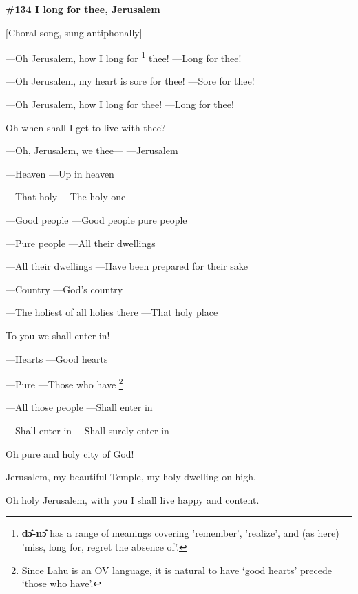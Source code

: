 
\textbf{\#134  I long for thee, Jerusalem}

[Choral song, sung antiphonally]

---Oh Jerusalem, how I long for \footnote{\textbf{ dɔ̂-nɔ̂ }has a range of meanings covering 'remember', 'realize', and (as here) 'miss, long for, regret the absence of'.} thee! ---Long for thee!

---Oh Jerusalem, my heart is sore for thee! ---Sore for thee!

---Oh Jerusalem, how I long for thee!  ---Long for thee!

Oh when shall I get to live with thee?

---Oh, Jerusalem, we thee---   ---Jerusalem

---Heaven     ---Up in heaven

---That holy     ---The holy one

---Good people    ---Good people pure people

---Pure people     ---All their dwellings

---All their dwellings    ---Have been prepared for their sake

---Country     ---God's country

---The holiest of all holies there  ---That holy place

To you we shall enter in!

---Hearts     ---Good hearts

---Pure      ---Those who have \footnote{Since Lahu is an OV language, it is natural to have `good hearts' precede `those who have'.}

---All those people    ---Shall enter in

---Shall enter in    ---Shall surely enter in

Oh pure and holy city of God!

Jerusalem, my beautiful Temple, my holy dwelling on high,

Oh holy Jerusalem, with you I shall live happy and content.

